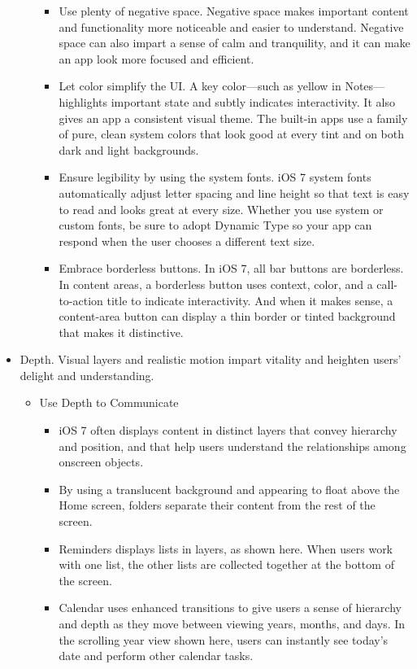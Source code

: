 \begin{itemize}
\begin{itemize}
\begin{itemize}
		\item Use plenty of negative space. Negative space makes important content and functionality more noticeable and easier to understand. Negative space can also impart a sense of calm and tranquility, and it can make an app look more focused and efficient.
		\item Let color simplify the UI. A key color—such as yellow in Notes— highlights important state and subtly indicates interactivity. It also gives an app a consistent visual theme. The built-in apps use a family of pure, clean system colors that look good at every tint and on both dark and light backgrounds.
		\item Ensure legibility by using the system fonts. iOS 7 system fonts automatically adjust letter spacing and line height so that text is easy to read and looks great at every size. Whether you use system or custom fonts, be sure to adopt Dynamic Type so your app can respond when the user chooses a different text size.
		\item Embrace borderless buttons. In iOS 7, all bar buttons are borderless. In content areas, a borderless button uses context, color, and a call-to-action title to indicate interactivity. And when it makes sense, a content-area button can display a thin border or tinted background that makes it distinctive.
		\end{itemize}
	\end{itemize}
\item Depth. Visual layers and realistic motion impart vitality and heighten users’ delight and understanding.
	\begin{itemize}
	\item Use Depth to Communicate
		\begin{itemize}
		\item iOS 7 often displays content in distinct layers that convey hierarchy and position, and that help users understand the relationships among onscreen objects.
		\item By using a translucent background and appearing to float above the Home screen, folders separate their content from the rest of the screen.
		\item Reminders displays lists in layers, as shown here. When users work with one list, the other lists are collected together at the bottom of the screen.
		\item Calendar uses enhanced transitions to give users a sense of hierarchy and depth as they move between viewing years, months, and days. In the scrolling year view shown here, users can instantly see today’s date and perform other calendar tasks.

\end{itemize}
\end{itemize}
\end{itemize}
